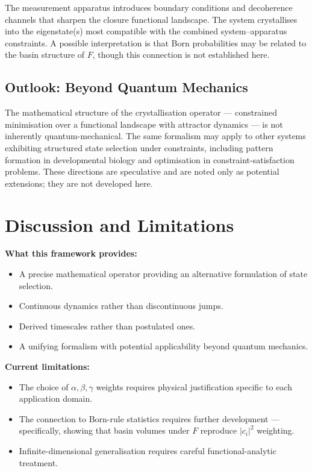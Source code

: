 \documentclass[12pt]{article}
\begin{document}
The measurement apparatus introduces boundary conditions and decoherence channels that sharpen the closure functional landscape. The system crystallises into the eigenstate(s) most compatible with the combined system--apparatus constraints. A possible interpretation is that Born probabilities may be related to the basin structure of $F$, though this connection is not established here.

\subsection{Outlook: Beyond Quantum Mechanics}

The mathematical structure of the crystallisation operator --- constrained minimisation over a functional landscape with attractor dynamics --- is not inherently quantum-mechanical. The same formalism may apply to other systems exhibiting structured state selection under constraints, including pattern formation in developmental biology and optimisation in constraint-satisfaction problems. These directions are speculative and are noted only as potential extensions; they are not developed here.

\section{Discussion and Limitations}

\textbf{What this framework provides:}
\begin{itemize}
    \item A precise mathematical operator providing an alternative formulation of state selection.
    \item Continuous dynamics rather than discontinuous jumps.
    \item Derived timescales rather than postulated ones.
    \item A unifying formalism with potential applicability beyond quantum mechanics.
\end{itemize}

\textbf{Current limitations:}
\begin{itemize}
    \item The choice of $\alpha, \beta, \gamma$ weights requires physical justification specific to each application domain.
    \item The connection to Born-rule statistics requires further development --- specifically, showing that basin volumes under $F$ reproduce $|c_i|^2$ weighting.
    \item Infinite-dimensional generalisation requires careful functional-analytic treatment.
\end{itemize}
\end{document}
